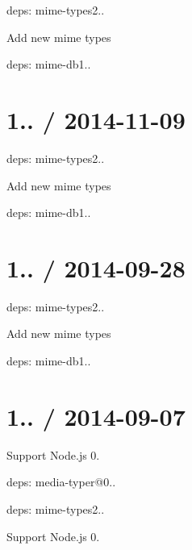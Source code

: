 \begin{DoxyItemize}
\item deps\+: mime-\/types2..
\begin{DoxyItemize}
\item Add new mime types
\item deps\+: mime-\/db1..
\end{DoxyItemize}
\end{DoxyItemize}

\section*{1.. / 2014-\/11-\/09 }


\begin{DoxyItemize}
\item deps\+: mime-\/types2..
\begin{DoxyItemize}
\item Add new mime types
\item deps\+: mime-\/db1..
\end{DoxyItemize}
\end{DoxyItemize}

\section*{1.. / 2014-\/09-\/28 }


\begin{DoxyItemize}
\item deps\+: mime-\/types2..
\begin{DoxyItemize}
\item Add new mime types
\item deps\+: mime-\/db1..
\end{DoxyItemize}
\end{DoxyItemize}

\section*{1.. / 2014-\/09-\/07 }


\begin{DoxyItemize}
\item Support Node.\+js 0.
\item deps\+: media-\/typer@0..
\item deps\+: mime-\/types2..
\begin{DoxyItemize}
\item Support Node.\+js 0.
\end{DoxyItemize}
\end{DoxyItemize}

